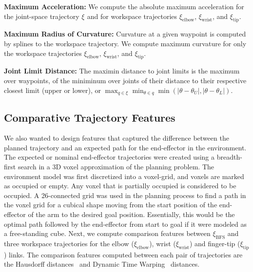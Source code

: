 \documentclass[letterpaper, 10 pt, conference]{ieeeconf}  %
\newcommand{\tj}[1]{\ensuremath{\xi_\text{#1}}}
\begin{document}
{\bf Maximum Acceleration:}
We compute the absolute maximum acceleration for the joint-space trajectory \tj{} and for workspace trajectories $\xi_\text{elbow}$, $\xi_\text{wrist}$, and $\xi_\text{tip}$.

{\bf Maximum Radius of Curvature: }
Curvature at a given waypoint is computed by splines to the workspace trajectory. We compute maximum curvature for only the workspace trajectories $\xi_\text{elbow}$, $\xi_\text{wrist}$, and $\xi_\text{tip}$.

{\bf Joint Limit Distance: }
The maximin distance to joint limits is the maximum over waypoints, of the miniminum over joints of their distance to their respective closest limit (upper or lower), or $\max_{q \in \tj{}} \min_{\theta \in q} \min(|\theta-\theta_U|,|\theta-\theta_L|)$.

\subsection{Comparative Trajectory Features}
\label{subsec:multi_traj_feat}
We also wanted to design features that captured the difference between the planned trajectory and an expected path for the end-effector in the environment. The expected or nominal end-effector trajectories were created using a breadth-first search in a 3D voxel approximation of the planning problem. The environment model was first discretized into a voxel-grid, and voxels are marked as occupied or empty. Any voxel that is partially occupied is considered to be occupied. A 26-connected grid was used in the planning process to find a path in the voxel grid for a cubical shape moving from the start position of the end-effector of the arm to the desired goal position.  Essentially, this would be the optimal path followed by the end-effector from start to goal if it were modeled as a free-standing cube. Next, we compute comparison features between $\xi_{\text{BFS}}$ and three workspace trajectories for the elbow ($\xi_\text{elbow}$), wrist ($\xi_\text{wrist}$) and finger-tip ($\xi_\text{tip}$) links. The comparison features computed between each pair of trajectories are the Hausdorff distances~\cite{dubuisson1994modified} and Dynamic Time Warping~\cite{senin2008dynamic} distances. 
\end{document}
